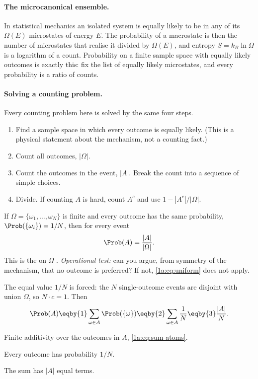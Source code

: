 \paragraph{The microcanonical ensemble.}
In statistical mechanics an isolated system is equally likely to be in any of
its $\Omega(E)$ microstates of energy $E$. The probability of a macrostate is
then the number of microstates that realise it divided by $\Omega(E)$, and
entropy $S=k_B\ln\Omega$ is a logarithm of a count. Probability on a finite
sample space with equally likely outcomes is exactly this: fix the list of
equally likely microstates, and every probability is a ratio of counts.

\paragraph{Solving a counting problem.}
Every counting problem here is solved by the same four steps.
\begin{enumerate}[leftmargin=1.5em,itemsep=1pt]
  \item Find a sample space in which every outcome is equally likely. (This is
        a physical statement about the mechanism, not a counting fact.)
  \item Count all outcomes, $|\Omega|$.
  \item Count the outcomes in the event, $|A|$. Break the count into a
        sequence of simple choices.
  \item Divide. If counting $A$ is hard, count $A^c$ and use $1-|A^c|/|\Omega|$.
\end{enumerate}

\begin{workdef}
If $\Omega=\{\omega_1,\dots,\omega_N\}$ is finite and every outcome has the
same probability, $\Prob(\{\omega_i\})=1/N$, then for every event
\begin{equation}
\Prob(A)=\frac{|A|}{|\Omega|}.
\label{1a:eq:uniform}
\end{equation}
This is the  on $\Omega$
.
\emph{Operational test:} can you argue, from symmetry of the mechanism, that
no outcome is preferred? If not, \eqref{1a:eq:uniform} does not apply.
\end{workdef}

The equal value $1/N$ is forced: the $N$ single-outcome events are disjoint with
union $\Omega$, so $N\cdot c=1$. Then
\begin{align*}
\Prob(A)\eqby{1}\sum_{\omega\in A}\Prob(\{\omega\})\eqby{2}\sum_{\omega\in A}\frac1N
\eqby{3}\frac{|A|}{N}.
\end{align*}
\begin{explain}
  \item Finite additivity over the outcomes in $A$, \eqref{1a:eq:sum-atoms}.
  \item Every outcome has probability $1/N$.
  \item The sum has $|A|$ equal terms.
\end{explain}

